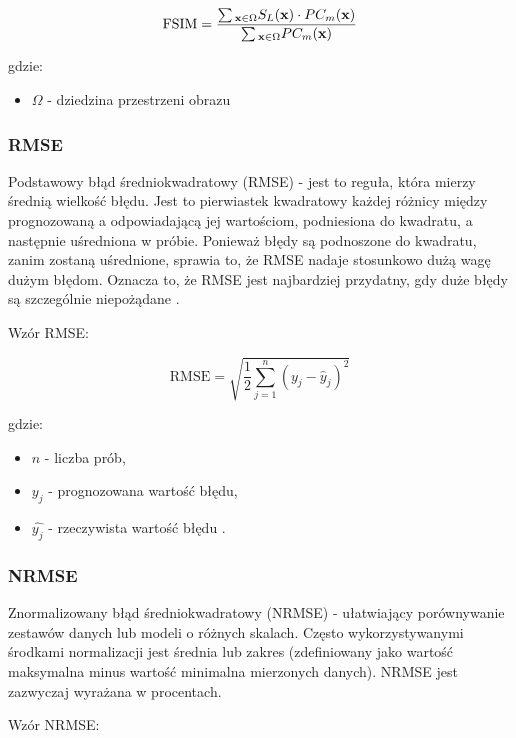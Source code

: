 \documentclass{article}
\begin{document}
\begin{equation}
  \mathrm{FSIM} = {{\sum\limits {_{{\bf x} \in \Omega } {S_{L}}({\bf x}) \cdot PC_{m}({\bf x})} } \over {\sum\limits {_{{\bf x} \in \Omega } PC_{m}({\bf x})}}}
\end{equation}

gdzie:
\begin{itemize}[label=]
  \item $\Omega$ - dziedzina przestrzeni obrazu
\end{itemize}

\subsubsection{RMSE}

Podstawowy błąd średniokwadratowy (RMSE) - jest to reguła, która mierzy średnią wielkość błędu. Jest to pierwiastek kwadratowy każdej różnicy między prognozowaną a odpowiadającą jej wartościom, podniesiona do kwadratu, a następnie uśredniona w próbie. Ponieważ błędy są podnoszone do kwadratu, zanim zostaną uśrednione, sprawia to, że RMSE nadaje stosunkowo dużą wagę dużym błędom. Oznacza to, że RMSE jest najbardziej przydatny, gdy duże błędy są szczególnie niepożądane \cite{rmse}.

Wzór RMSE:

\begin{equation}
    \mathrm{RMSE}=\sqrt{\frac{1}{2}\sum_{j=1}^{n}(y_j - \hat{y}_j)^2}
\end{equation}

gdzie:
\begin{itemize}[label=]
  \item $n$ - liczba prób,
  \item $y_{j}$ - prognozowana wartość błędu,
  \item $\hat{y_{j}}$ - rzeczywista wartość błędu \cite{rmse}.
\end{itemize}

\subsubsection{NRMSE}

Znormalizowany błąd średniokwadratowy (NRMSE) - ułatwiający porównywanie zestawów danych lub modeli o różnych skalach. Często wykorzystywanymi środkami normalizacji jest średnia lub zakres (zdefiniowany jako wartość maksymalna minus wartość minimalna mierzonych danych). NRMSE jest zazwyczaj wyrażana w procentach.

Wzór NRMSE:
\end{document}
